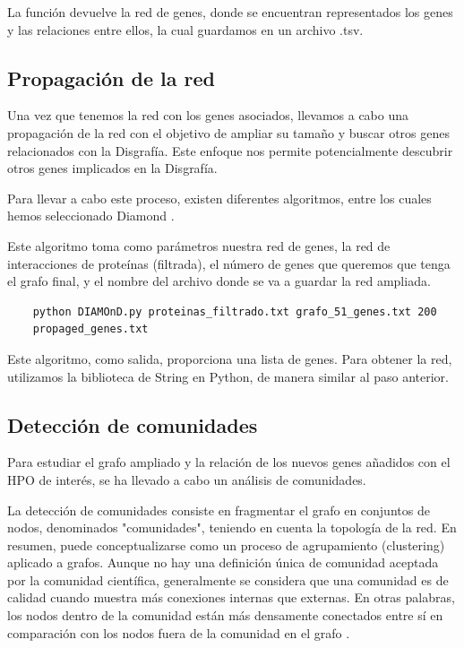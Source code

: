 La función devuelve la red de genes, donde se encuentran representados los genes y las relaciones entre ellos, la cual guardamos en un archivo .tsv.


\subsection{Propagación de la red}

Una vez que tenemos la red con los genes asociados, llevamos a cabo una propagación de la red con el objetivo de ampliar su tamaño y buscar otros genes relacionados con la Disgrafía. Este enfoque nos permite potencialmente descubrir otros genes implicados en la Disgrafía.

Para llevar a cabo este proceso, existen diferentes algoritmos, entre los cuales hemos seleccionado Diamond \cite{Diamond2015}.

Este algoritmo toma como parámetros nuestra red de genes, la red de interacciones de proteínas (filtrada), el número de genes que queremos que tenga el grafo final, y el nombre del archivo donde se va a guardar la red ampliada.

\begin{verbatim}
	python DIAMOnD.py proteinas_filtrado.txt grafo_51_genes.txt 200
	propaged_genes.txt
\end{verbatim}

Este algoritmo, como salida, proporciona una lista de genes. Para obtener la red, utilizamos la biblioteca de String en Python, de manera similar al paso anterior.

\subsection{Detección de comunidades}

Para estudiar el grafo ampliado y la relación de los nuevos genes añadidos con el HPO de interés, se ha llevado a cabo un análisis de comunidades.

La detección de comunidades consiste en fragmentar el grafo en conjuntos de nodos, denominados "comunidades", teniendo en cuenta la topología de la red. En resumen, puede conceptualizarse como un proceso de agrupamiento (clustering) aplicado a grafos. Aunque no hay una definición única de comunidad aceptada por la comunidad científica, generalmente se considera que una comunidad es de calidad cuando muestra más conexiones internas que externas. En otras palabras, los nodos dentro de la comunidad están más densamente conectados entre sí en comparación con los nodos fuera de la comunidad en el grafo \cite{PanizoLledot}.

